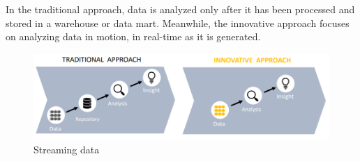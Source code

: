 In the traditional approach, data is analyzed only after it has been processed and stored in a warehouse or data mart. 
Meanwhile, the innovative approach focuses on analyzing data in motion, in real-time as it is generated.
\begin{figure}[H]
    \centering
    \includegraphics[width=0.75\linewidth]{images/in3.png}
    \caption{Streaming data}
\end{figure}